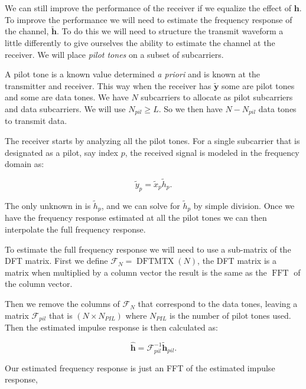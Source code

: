 We can still improve the performance of the receiver if we equalize the effect of $\mathbf{h}$. To improve the performance we will need to estimate the frequency response of the channel, $\tilde{\mathbf{h}}$. To do this we will need to structure the transmit waveform a little differently to give ourselves the ability to estimate the channel at the receiver. We will place \emph{pilot tones} on a subset of subcarriers.

A pilot tone is a known value determined \emph{a priori} and is known at the transmitter and receiver. This way when the receiver has $\tilde{\mathbf{y}}$ some are pilot tones and some are data tones. We have $N$ subcarriers to allocate as pilot subcarriers and data subcarriers. We will use $N_{pil} \geq L$. So we then have $N-N_{pil}$ data tones to transmit data.

The receiver starts by analyzing all the pilot tones. For a single subcarrier that is designated as a pilot, say index $p$, the received signal is modeled in the frequency domain as:

\begin{equation}
\label{eq:psubcar}
\tilde{y}_p = \tilde{x}_p\tilde{h}_p.
\end{equation}

\noindent
The only unknown in  is $\tilde{h}_p$, and we can solve for $\tilde{h}_p$ by simple division. Once we have the frequency response estimated at all the pilot tones we can then interpolate the full frequency response.

To estimate the full frequency response we will need to use a sub-matrix of the \ac{DFT} matrix. First we define $\mathbf{\mathcal{F}}_N=\operatorname{DFTMTX}(N)$, the \ac{DFT} matrix is a matrix when multiplied by a column vector the result is the same as the $\operatorname{FFT}$ of the column vector.

Then we remove the columns of $\mathbf{\mathcal{F}}_N$ that correspond to the data tones, leaving a matrix $\mathbf{\mathcal{F}}_{pil}$ that is $(N\times N_{PIL})$ where $N_{PIL}$ is the number of pilot tones used. Then the estimated impulse response is then calculated as:

\begin{equation}
\hat{\mathbf{h}} = \mathbf{\mathcal{F}}_{pil}^{-1}\tilde{\mathbf{h}}_{pil}.
\end{equation}
\noindent

Our estimated frequency response is just an \ac{FFT} of the estimated impulse response,

